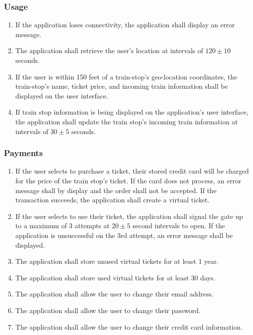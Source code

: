 	\subsubsection{Usage}\begin{enumerate}
		\item If the application loses connectivity, the application shall display an error message. 
		\item The application shall retrieve the user’s location at intervals of $120\pm10$ seconds.
		\item If the user is within 150 feet of a train-stop’s geo-location coordinates, the train-stop’s name, ticket price, and incoming train information shall be displayed on the user interface.
		\item If train stop information is being displayed on the application’s user interface, the application shall update the train stop’s incoming train information at intervals of $30\pm 5$ seconds.
	\end{enumerate}
	
	\subsubsection{Payments}\begin{enumerate}
		\item If the user selects to purchase a ticket, their stored credit card will be charged for the price of the train stop’s ticket. If the card does not process, an error message shall by display and the order shall not be accepted. If the transaction succeeds, the application shall create a virtual ticket.
		\item If the user selects to use their ticket, the application shall signal the gate up to a maximum of 3 attempts at $20\pm 5$ second intervals to open. If the application is unsuccessful on the 3rd attempt, an error message shall be displayed.
		\item The application shall store unused virtual tickets for at least 1 year.
		\item The application shall store used virtual tickets for at least 30 days.
		\item The application shall allow the user to change their email address.
		\item The application shall allow the user to change their password.
		\item The application shall allow the user to change their credit card information.
	\end{enumerate}		
\newpage	
